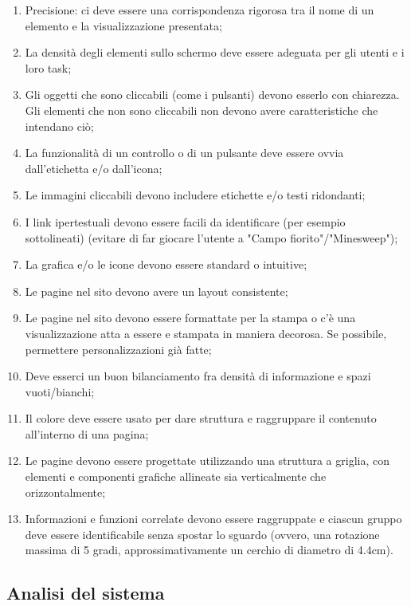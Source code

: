 \begin{enumerate}
    \item Precisione: ci deve essere una corrispondenza rigorosa tra il nome di un elemento e la visualizzazione presentata;\label{lg:30}
    \item La densità degli elementi sullo schermo deve essere adeguata per gli utenti e i loro task;\label{lg:31}
    \item Gli oggetti che sono cliccabili (come i pulsanti) devono esserlo con chiarezza. Gli elementi che non sono cliccabili non devono avere caratteristiche che intendano ciò;\label{lg:32}
    \item La funzionalità di un controllo o di un pulsante deve essere ovvia dall'etichetta e/o dall'icona;\label{lg:33}
    \item Le immagini  cliccabili devono includere etichette e/o testi ridondanti;\label{lg:34}
    \item I link ipertestuali devono essere facili da identificare (per esempio sottolineati) (evitare di far giocare l'utente a "Campo fiorito"/"Minesweep");\label{lg:35}
    \item La grafica e/o le icone devono essere standard o intuitive;\label{lg:36}
    \item Le pagine nel sito devono avere un layout consistente;\label{lg:37}
    \item Le pagine nel sito devono essere formattate per la stampa o c'è una visualizzazione atta a essere e stampata in maniera decorosa. Se possibile, permettere personalizzazioni già fatte;\label{lg:38}
    \item Deve esserci un buon bilanciamento fra densità di informazione e spazi vuoti/bianchi;\label{lg:39}
    \item Il colore deve essere usato per dare struttura e raggruppare il contenuto all'interno di una pagina;\label{lg:40}
    \item Le pagine devono essere progettate utilizzando una struttura a griglia, con elementi e componenti grafiche allineate sia verticalmente che orizzontalmente;\label{lg:41}
    \item Informazioni e funzioni correlate devono essere raggruppate e ciascun gruppo deve essere identificabile senza spostar lo sguardo (ovvero, una rotazione massima di 5 gradi, approssimativamente un cerchio di diametro di 4.4cm).\label{lg:42}
\end{enumerate}

\subsection{Analisi del sistema}

